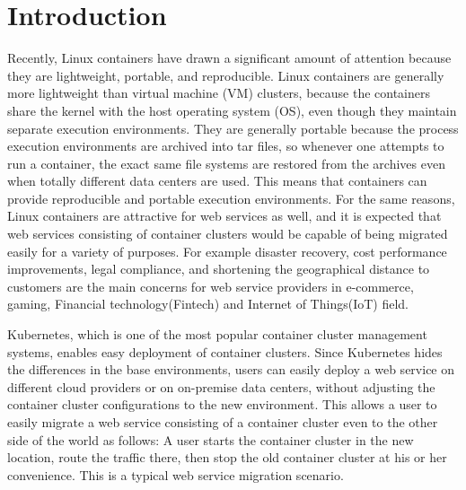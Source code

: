 \section{Introduction}

Recently, Linux containers have drawn a significant amount of attention because they are lightweight, portable, and reproducible.
Linux containers are generally more lightweight than virtual machine (VM) clusters, because the containers share the kernel with the host operating system (OS), even though they maintain separate execution environments.
They are generally portable because the process execution environments are archived into tar files,
so whenever one attempts to run a container, the exact same file systems are restored from the archives
even when totally different data centers are used.
This means that containers can provide reproducible and portable execution environments.
%
For the same reasons, Linux containers are attractive for web services as well,
and it is expected that web services consisting of container clusters would be
capable of being migrated easily for a variety of purposes. For example disaster recovery,
cost performance improvements, legal compliance, and shortening the geographical distance to customers
are the main concerns for web service providers in e-commerce, gaming, Financial technology(Fintech) and Internet of Things(IoT) field.
%

Kubernetes\cite{K8s2017}, which is one of the most popular container cluster management systems, 
enables easy deployment of container clusters.
Since Kubernetes hides the differences in the base environments, users can easily deploy a web service on different 
cloud providers or on on-premise data centers, without adjusting the container cluster configurations to the new environment. 
This allows a user to easily migrate a web service consisting of a container cluster even to the other side of the world as follows: 
A user starts the container cluster in the new location, route the traffic there, 
then stop the old container cluster at his or her convenience.
This is a typical web service migration scenario.

